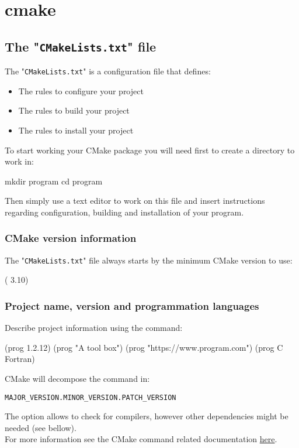 \section{cmake}



\subsection{The "\texttt{CMakeLists.txt}" file} 

The "\texttt{CMakeLists.txt}" is a configuration file that defines:  
\begin{itemize}
\item The rules to configure your project
\item The rules to build your project
\item The rules to install your project
\end{itemize}
To start working your CMake package you will need first to create a directory to work in:
\begin{script}
\fprompt{~} mkdir program
\fprompt{~} cd program
\end{script}
Then simply use a text editor to work on this file and insert instructions regarding configuration, building and installation of your program. 

\subsubsection*{CMake version information}

The "\texttt{CMakeLists.txt}" file always starts by the minimum CMake version to use: 
\begin{script}
 ( 3.10)
\end{script}

\subsubsection*{Project name, version and programmation languages}

Describe project information using the  command:
\begin{script}
 (prog  1.2.12)
 (prog  "A tool box")
 (prog  "https://www.program.com")
 (prog  C Fortran)
\end{script}
CMake will decompose the  command in:
\begin{center}\texttt{MAJOR\_VERSION.MINOR\_VERSION.PATCH\_VERSION} \end{center}
The  option allows to check for compilers, however other dependencies might be needed (see bellow). \\[0.25cm]
For more information see the CMake  command related documentation \href{https://cmake.org/cmake/help/latest/command/project.html\#command:project}{here}.

